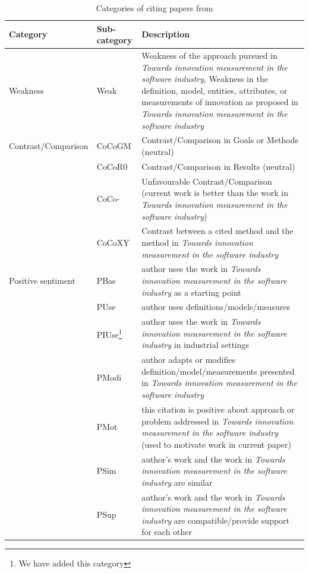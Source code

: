 \documentclass[sigconf,review]{acmart}
\newcommand{\theArticle}{\textit{Towards innovation measurement in the software industry}}
\begin{document}
\begin{table}
	\caption{Categories of citing papers from \citet{teufel2006annotation}}\label{tab:CitationCategories}
	\begin{tabular}{llp{12cm}}
		\toprule
		\textbf{Category}            & \textbf{Sub-category }& \textbf{Description}                                                                                                            \\ \midrule
		Weakness            & Weak         & Weakness of the approach pursued in \theArticle, Weakness in the definition, model, entities, attributes, or measurements of innovation as proposed in \theArticle                                                                                              \\
		\midrule
		Contrast/Comparison & CoCoGM       & Contrast\slash Comparison in Goals or Methods (neutral)                                                                    \\
		& CoCoR0       & Contrast\slash Comparison in Results (neutral)                                                                               \\
		& CoCo-        & Unfavourable Contrast\slash Comparison (current work is better than the work in \theArticle)                                            \\
		& CoCoXY       & Contrast between a cited method and the method in \theArticle                                                                                     \\
		
		\midrule
		Positive sentiment  & PBas         & author uses the work in \theArticle{} as a starting point                                                                               \\
		& PUse         & author uses definitions\slash models\slash measures                                                                                      \\
		& PIUse\footnote{We have added this category}         & author uses the work in \theArticle{} in industrial settings \\
		& PModi        & author adapts or modifies definition\slash model\slash measurements presented in \theArticle                                                                            \\
		& PMot         & this citation is positive about approach or problem addressed in \theArticle{} (used to motivate work in current paper)                 \\
		& PSim         & author's work and the work in \theArticle{} are similar                                                                               \\
		& PSup         & author's work and the work in \theArticle{} are compatible\slash provide support for each other                                           \\
		

\end{tabular}
\end{table}
\end{document}
